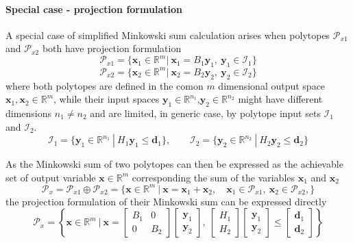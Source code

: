 \paragraph*{Special case - projection formulation}
A special case of simplified Minkowski sum calculation arises when polytopes $\mathcal{P}_{x1}$ and $\mathcal{P}_{x2}$ both have projection formulation
\begin{equation}
    \mathcal{P}_{x1}=\{\bm{x}_1\in\mathbb{R}^m |~ \bm{x}_1 = B_1\bm{y}_1,~\bm{y}_1 \in \mathcal{I}_1  \}
\end{equation}
\begin{equation}
    \mathcal{P}_{x2}=\{\bm{x}_2\in\mathbb{R}^m |~ \bm{x}_2 = B_2\bm{y}_2,~\bm{y}_2 \in \mathcal{I}_2  \}
\end{equation}
where both polytopes are defined in the comon $m$ dimensional output space $\bm{x}_1,\bm{x}_2\in\mathbb{R}^m$, while their input spaces $\bm{y}_1\in\mathbb{R}^{n_1}$,$\bm{y}_2\in\mathbb{R}^{n_2}$ might have different dimensions $n_1\neq n_2$ and are limited, in generic case, by polytope input sets $\mathcal{I}_1$ and $\mathcal{I}_2$.
\begin{equation}
    \mathcal{I}_{1}=\{\bm{y}_1\in\mathbb{R}^{n_1} ~|~ H_1\bm{y}_1 \leq \bm{d}_1\}, \qquad
    \mathcal{I}_{2}=\{\bm{y}_2\in\mathbb{R}^{n_2} ~|~ H_2\bm{y}_2 \leq \bm{d}_2\}
\end{equation}

As the Minkowski sum of two polytopes can then be expressed as the achievable set of output variable $\bm{x}\in\mathbb{R}^m$ corresponding the sum of the variables $\bm{x}_1$ and $\bm{x}_2$
\begin{equation}
    \mathcal{P}_{x}= \mathcal{P}_{x1} \oplus \mathcal{P}_{x2} = \{\bm{x}\in\mathbb{R}^m ~|~ \bm{x} =  \bm{x}_1 + \bm{x}_2, \quad \bm{x}_1 \in \mathcal{P}_{x1}, ~\bm{x}_2 \in \mathcal{P}_{x2},  \}
\end{equation}
the projection formulation of their Minkowski sum can be expressed directly
\begin{equation}
    \mathcal{P}_{x}=\left\{\bm{x}\in\mathbb{R}^m ~\bigg|~ 
    \bm{x} = \begin{bmatrix}
        B_1 & 0 \\
        0 & B_2
    \end{bmatrix}\begin{bmatrix}
        \bm{y}_1 \\
        \bm{y}_2
    \end{bmatrix}, ~\begin{bmatrix}
        H_1  \\
        H_2
    \end{bmatrix} \begin{bmatrix}
        \bm{y}_1 \\
        \bm{y}_2
    \end{bmatrix} \leq \begin{bmatrix}
        \bm{d}_1  \\
        \bm{d}_2
    \end{bmatrix} \right\}
\end{equation}

